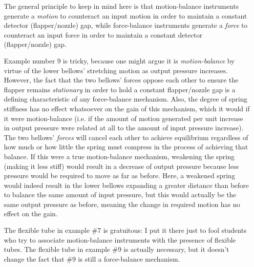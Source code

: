 The general principle to keep in mind here is that motion-balance instruments generate a {\it motion} to counteract an input motion in order to maintain a constant detector (flapper/nozzle) gap, while force-balance instruments generate a {\it force} to counteract an input force in order to maintain a constant detector (flapper/nozzle) gap.

\vskip 10pt

Example number 9 is tricky, because one might argue it is {\it motion-balance} by virtue of the lower bellows' stretching motion as output pressure increases.  However, the fact that the two bellows' forces oppose each other to ensure the flapper remains {\it stationary} in order to hold a constant flapper/nozzle gap is a defining characteristic of any force-balance mechanism.  Also, the degree of spring stiffness has no effect whatsoever on the gain of this mechanism, which it would if it were motion-balance (i.e. if the amount of motion generated per unit increase in output pressure were related at all to the amount of input pressure increase).  The two bellows' {\it forces} will cancel each other to achieve equilibrium regardless of how much or how little the spring must compress in the process of achieving that balance.  If this were a true motion-balance mechanism, weakening the spring (making it less stiff) would result in a decrease of output pressure because less pressure would be required to move as far as before.  Here, a weakened spring would indeed result in the lower bellows expanding a greater distance than before to balance the same amount of input pressure, but this would actually be the same output pressure as before, meaning the change in required motion has no effect on the gain.







The flexible tube in example \#7 is gratuitous: I put it there just to fool students who try to associate motion-balance instruments with the presence of flexible tubes.  The flexible tube in example \#9 is actually necessary, but it doesn't change the fact that \#9 is still a force-balance mechanism.





